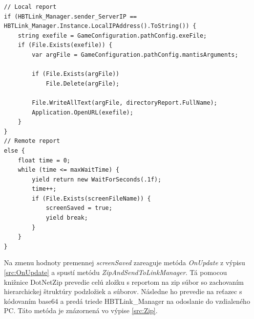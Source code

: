 \documentclass[slovak, bachelorpractice]{diploma}
\begin{document}
\vspace{10pt}
\begin{lstlisting}[label=src:Report,caption={Vytváranie lokálneho a vzdialeného záznamu o chybe}]
// Local report
if (HBTLink_Manager.sender_ServerIP == HBTLink_Manager.Instance.LocalIPAddress().ToString()) {
    string exefile = GameConfiguration.pathConfig.exeFile;
    if (File.Exists(exefile)) {
        var argFile = GameConfiguration.pathConfig.mantisArguments;

        if (File.Exists(argFile))
            File.Delete(argFile);

        File.WriteAllText(argFile, directoryReport.FullName);
        Application.OpenURL(exefile);
    }
}
// Remote report
else {
    float time = 0;
    while (time <= maxWaitTime) {
        yield return new WaitForSeconds(.1f);
        time++;
        if (File.Exists(screenFileName)) {
            screenSaved = true;
            yield break;
        }
    }
}
\end{lstlisting}

Na zmenu hodnoty premennej \textit{screenSaved} zareaguje metóda \textit{OnUpdate} z výpisu \ref{src:OnUpdate} a spustí metódu \textit{ZipAndSendToLinkManager}. Tá pomocou knižnice DotNetZip \cite{DotNetZip} prevedie celú zložku s reportom na zip súbor so zachovaním hierarchickej štruktúry podzložiek a súborov. Následne ho prevedie na reťazec s kódovaním base64 a predá triede HBTLink\_Manager na odoslanie do vzdialeného PC. Táto metóda je znázornená vo výpise \ref{src:Zip}. 
\end{document}
